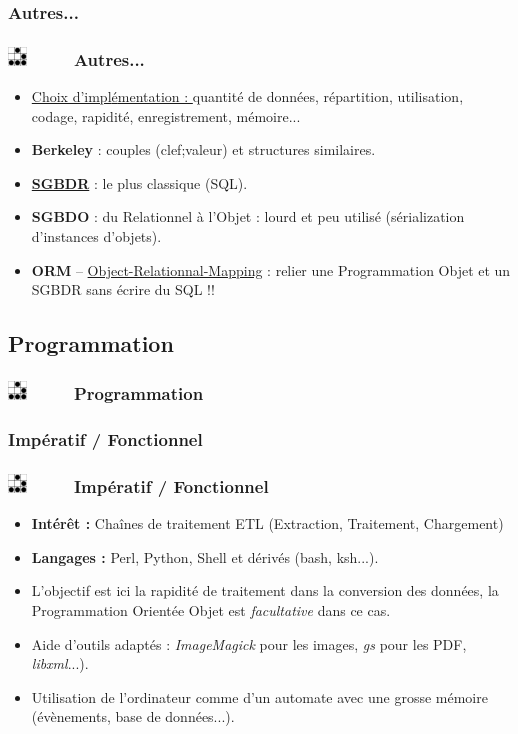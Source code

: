 \documentclass[slidetop,11pt]{beamer}
\def\sectionPartIbTR{Autres...}
\def\sectionPartIc{Programmation}
\def\sectionPartIcUN{Imp{\'e}ratif / Fonctionnel}
\def\moreInFrameTitle{\includegraphics[height=0.5cm]{img/logo_glider.png}~~~~~}
\begin{document}
\subsubsection{\sectionPartIbTR}
\begin{frame}
	\frametitle{\moreInFrameTitle \sectionPartIbTR}
	\begin{itemize}	
		\item \underline{Choix d'impl{\'e}mentation : } quantit{\'e} de donn{\'e}es, r{\'e}partition, utilisation, codage, rapidit{\'e}, enregistrement, m{\'e}moire...
		\item \textbf{Berkeley} : couples (clef;valeur) et structures similaires. 
		\item \textbf{\underline{SGBDR}} : le plus classique (SQL). 
		\item \textbf{SGBDO} : du Relationnel {\`a} l'Objet : lourd et peu utilis{\'e} (s{\'e}rialization d'instances d'objets). 
		\item \textbf{ORM} -- \underline{Object-Relationnal-Mapping} : relier une Programmation Objet et un SGBDR sans {\'e}crire du SQL !!
	\end{itemize}
\end{frame} 


\subsection{\sectionPartIc}
\begin{frame}
	\frametitle{\moreInFrameTitle \sectionPartIc}
	\tableofcontents[sections=2,subsectionstyle=show/shaded/hide]
\end{frame} 

\subsubsection{\sectionPartIcUN}
\begin{frame}
	\frametitle{\moreInFrameTitle \sectionPartIcUN}
	\begin{itemize}	
		\item \textbf{Int{\'e}r{\^e}t : } Cha{\^i}nes de traitement ETL (Extraction, Traitement, Chargement)
		\item \textbf{Langages : } Perl, Python, Shell et d{\'e}riv{\'e}s (bash, ksh...). 
		\item L'objectif est ici la rapidit{\'e} de traitement dans la conversion des donn{\'e}es, la Programmation Orient{\'e}e Objet est \emph{facultative} dans ce cas. 
		\item Aide d'outils adapt{\'e}s : \emph{ImageMagick} pour les images, \emph{gs} pour les PDF, \emph{libxml}...). 
		\item Utilisation de l'ordinateur comme d'un automate avec une grosse m{\'e}moire ({\'e}v{\`e}nements, base de donn{\'e}es...). 
	\end{itemize}
\end{frame} 
\end{document}
